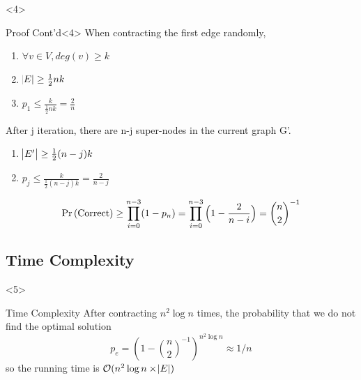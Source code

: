 \documentclass{beamer}
\begin{document}
\begin{frame}
\begin{overlayarea}{\linewidth}{\textheight}
\begin{onlyenv}
\end{onlyenv}
\begin{onlyenv}<4>
\begin{block}{Proof Cont'd}<4>
When contracting the first edge randomly,
\begin{enumerate}
	\item $\forall v \in V, deg(v)\geq k$
	\item $\abs{E}\geq \frac{1}{2}nk$
	\item $p_1\leq \frac{k}{\frac{1}{2}nk}=\frac{2}{n}$
\end{enumerate}
After j iteration, there are n-j super-nodes in the current graph G'.
\begin{enumerate}			
	\item $\abs{E'}\geq \frac{1}{2}(n-j)k$
	\item $p_j\leq \frac{k}{\frac{1}{2}(n-j)k}=\frac{2}{n-j}$
\end{enumerate}
\begin{equation*}
\Pr\left(\text{Correct}\right)\geq \prod _{i=0}^{n-3}(1-p_n) = \prod _{i=0}^{n-3}{\Bigl (}1-{\frac {2}{n-i}}{\Bigr )}={\binom n2}^{-1}
\end{equation*}
\end{block}
\end{onlyenv}
\subsection{Time Complexity}	
\begin{onlyenv}<5>
\begin{block}{Time Complexity}
After contracting $n^2\log{}n$ times, the probability that we do not find the optimal solution
\begin{equation*}
p_e = (1-{\binom n2}^{-1})^{n^2\log{}n} \approx 1/n
\end{equation*}
so the running time is $\mathcal{O}(n^2\log{}n\times \abs{E})$
\end{block}

\end{onlyenv}

\end{overlayarea}

\end{frame}

\end{document}
